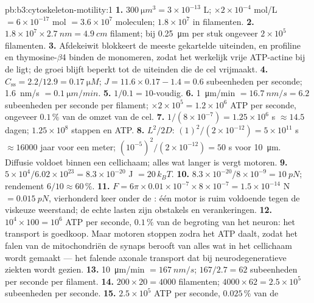 \begin{solution}{pb:b3:cytoskeleton-motility:1}
\textbf{1.} $\qty{300}{\micro m^3} = 3\times 10^{-13}$ L; $\times
2\times 10^{-4}$ mol/L $= 6\times 10^{-17}$ mol $= 3.6\times 10^{7}$
moleculen; $1.8\times 10^{7}$ in filamenten.
\textbf{2.} $1.8\times 10^{7}\times \qty{2.7}{nm} = \qty{4.9}{cm}$
filament; bij \qty{0.25}{\micro m} per stuk ongeveer $2\times 10^{5}$
filamenten.
\textbf{3.} Afdekeiwit blokkeert de meeste gekartelde uiteinden, en
profiline en thymosine-$\beta$4 binden de monomeren, zodat het werkelijk
vrije ATP-actine bij de  ligt; de groei blijft
beperkt tot de uiteinden die de cel vrijmaakt.
\textbf{4.} $C_{\text{ss}} = 2.2/12.9 = \qty{0.17}{\micro M}$; $J = 11.6
\times 0.17 - 1.4 = 0.6$ subeenheden per seconde; \qty{1.6}{nm/s} $=
\qty{0.1}{\micro m/min}$.
\textbf{5.} $1/0.1 = 10$-voudig.
\textbf{6.} \qty{1}{\micro m/min} $= \qty{16.7}{nm/s} = 6.2$ subeenheden
per seconde per filament; $\times 2\times 10^{5} = 1.2\times 10^{6}$ ATP
per seconde, ongeveer $0.1\,\%$ van de omzet van de cel.
\textbf{7.} $1/(8\times 10^{-7}) = 1.25\times 10^{6}$ s $\approx 14.5$
dagen; $1.25\times 10^{8}$ stappen en ATP.
\textbf{8.} $L^{2}/2D$: $(1)^{2}/(2\times 10^{-12}) = 5\times 10^{11}$ s
$\approx \num{16000}$ jaar voor een meter; $(10^{-5})^{2}/(2\times
10^{-12}) = 50$ s voor \qty{10}{\micro m}. Diffusie voldoet binnen een
cellichaam; alles wat langer is vergt motoren.
\textbf{9.} $5\times 10^{4}/6.02\times 10^{23} = 8.3\times 10^{-20}$ J
$= 20\,k_{B}T$.
\textbf{10.} $8.3\times 10^{-20}/8\times 10^{-9} = \qty{10}{pN}$;
rendement $6/10 \approx 60\,\%$.
\textbf{11.} $F = 6\pi\times 0.01\times 10^{-7}\times 8\times 10^{-7} =
1.5\times 10^{-14}$ N $= \qty{0.015}{pN}$, vierhonderd keer onder de
: één motor is ruim voldoende tegen de viskeuze weerstand;
de echte lasten zijn obstakels en verankeringen.
\textbf{12.} $10^{4}\times 100 = 10^{6}$ ATP per seconde, $0.1\,\%$ van
de begroting van het neuron: het transport is goedkoop. Maar motoren
stoppen zodra het ATP daalt, zodat het falen van de mitochondriën de
synaps berooft van alles wat in het cellichaam wordt gemaakt --- het
falende axonale transport dat bij neurodegeneratieve ziekten wordt
gezien.
\textbf{13.} \qty{10}{\micro m/min} $= \qty{167}{nm/s}$; $167/2.7 = 62$
subeenheden per seconde per filament.
\textbf{14.} $200\times 20 = 4000$ filamenten; $4000\times 62 = 2.5\times
10^{5}$ subeenheden per seconde.
\textbf{15.} $2.5\times 10^{5}$ ATP per seconde, $0.025\,\%$ van de

\end{solution}
